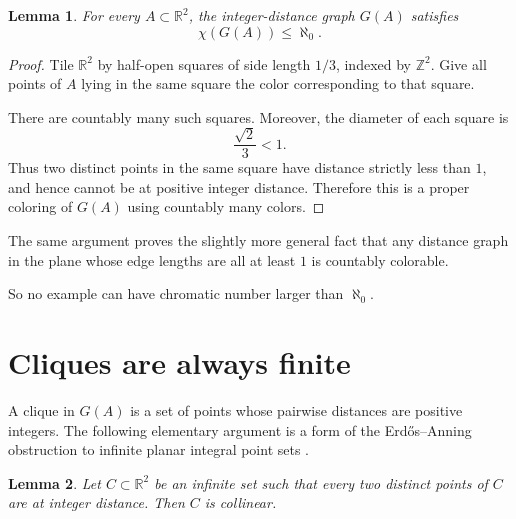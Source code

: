 \documentclass[11pt]{article}
\newtheorem{lemma}{Lemma}
\newcommand{\R}{\mathbb R}
\newcommand{\Z}{\mathbb Z}
\begin{document}
\begin{lemma}
For every \(A\subset \R^2\), the integer-distance graph \(G(A)\) satisfies
\[
\chi(G(A))\leq \aleph_0.
\]
\end{lemma}

\begin{proof}
Tile \(\R^2\) by half-open squares of side length \(1/3\), indexed by \(\Z^2\). Give all points of \(A\) lying in the same square the color corresponding to that square.

There are countably many such squares. Moreover, the diameter of each square is
\[
\frac{\sqrt2}{3}<1.
\]
Thus two distinct points in the same square have distance strictly less than \(1\), and hence cannot be at positive integer distance. Therefore this is a proper coloring of \(G(A)\) using countably many colors.
\end{proof}

The same argument proves the slightly more general fact that any distance graph in the plane whose edge lengths are all at least \(1\) is countably colorable.

So no example can have chromatic number larger than \(\aleph_0\).

\section{Cliques are always finite}

A clique in \(G(A)\) is a set of points whose pairwise distances are positive integers. The following elementary argument is a form of the Erdős--Anning obstruction to infinite planar integral point sets \cite{AnningErdos1945}.

\begin{lemma}
Let \(C\subset \R^2\) be an infinite set such that every two distinct points of \(C\) are at integer distance. Then \(C\) is collinear.
\end{lemma}
\end{document}
